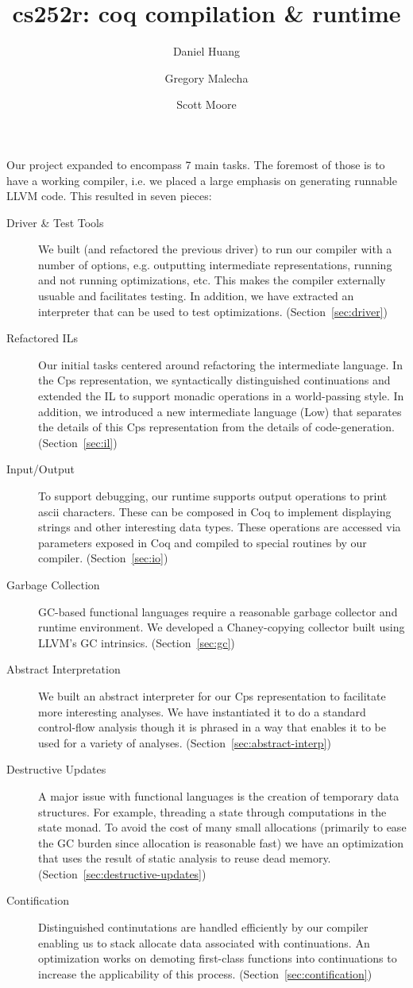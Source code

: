 \documentclass{article}
\title{cs252r: coq compilation \& runtime}
\author{Daniel Huang \and Gregory Malecha \and Scott Moore}
\begin{document}
\maketitle

Our project expanded to encompass 7 main tasks. The foremost of those is to have a working compiler, i.e. we placed a large emphasis on generating runnable LLVM code. This resulted in seven pieces:

\begin{description}
\item[Driver \& Test Tools]
We built (and refactored the previous driver) to run our compiler with a number of options, e.g. outputting intermediate representations, running and not running optimizations, etc. This makes the compiler externally usuable and facilitates testing. In addition, we have extracted an interpreter that can be used to test optimizations. (Section~\ref{sec:driver})
\item[Refactored ILs]
Our initial tasks centered around refactoring the intermediate language. In the Cps representation, we syntactically distinguished continuations and extended the IL to support monadic operations in a world-passing style. In addition, we introduced a new intermediate language (Low) that separates the details of this Cps representation from the details of code-generation. (Section~\ref{sec:il})
\item[Input/Output]
To support debugging, our runtime supports output operations to print ascii characters. These can be composed in Coq to implement displaying strings and other interesting data types. These operations are accessed via parameters exposed in Coq and compiled to special routines by our compiler. (Section~\ref{sec:io})
\item[Garbage Collection]
GC-based functional languages require a reasonable garbage collector and runtime environment. We developed a Chaney-copying collector built using LLVM's GC intrinsics. (Section~\ref{sec:gc})
\item[Abstract Interpretation] 
We built an abstract interpreter for our Cps representation to facilitate more interesting analyses. We have instantiated it to do a standard control-flow analysis though it is phrased in a way that enables it to be used for a variety of analyses. (Section~\ref{sec:abstract-interp})
\item[Destructive Updates]
A major issue with functional languages is the creation of temporary data structures. For example, threading a state through computations in the state monad. To avoid the cost of many small allocations (primarily to ease the GC burden since allocation is reasonable fast) we have an optimization that uses the result of static analysis to reuse dead memory. (Section~\ref{sec:destructive-updates})
\item[Contification]
Distinguished continutations are handled efficiently by our compiler enabling us to stack allocate data associated with continuations. An optimization works on demoting first-class functions into continuations to increase the applicability of this process. (Section~\ref{sec:contification})
\end{description}
\end{document}
